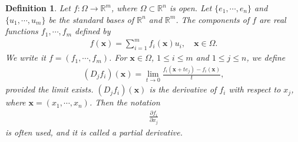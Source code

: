 \documentclass[11pt]{book}
\newtheorem{definition}{Definition}[chapter]
\theoremstyle{definition}
\numberwithin{equation}{chapter}
\begin{document}
\medskip

\begin{definition}
Let $f: \Omega \to \mathbb{R}^m$, where $\Omega \subset \mathbb{R}^n$ is open. Let $\{e_1, \cdots, e_n\}$ and $\{u_1, \cdots, u_m\}$ be the standard bases of $\mathbb{R}^n$ and $\mathbb{R}^m$. The components of $f$ are real functions $f_1, \cdots, f_m$ defined by
\begin{align*}
    f(\mathbf{x}) = \sum^m_{i=1} f_i(\mathbf{x}) u_i, \quad \mathbf{x} \in \Omega.
\end{align*}
We write it $f = (f_1, \cdots, f_m)$. For $\mathbf{x} \in \Omega$, $1 \leq i \leq m$ and $1 \leq j \leq n$, we define
\begin{align*}
    \left(D_jf_i\right)(\mathbf{x}) = \lim_{t\to 0} \frac{f_i(\mathbf{x} + te_j) - f_i(\mathbf{x})}{t},
\end{align*}
provided the limit exists. $\left(D_jf_i\right)(\mathbf{x})$ is the derivative of $f_i$ with respect to $x_j$, where $\mathbf{x} = (x_1, \cdots, x_n)$. Then the notation
\begin{align*}
    \frac{\partial f_i}{\partial x_j}
\end{align*}
is often used, and it is called a partial derivative.
\end{definition}

\medskip
\end{document}

